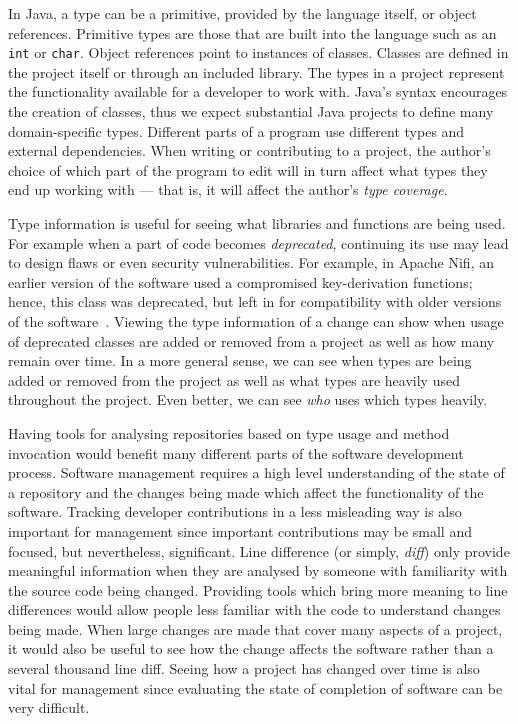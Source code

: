 \documentclass[conference]{IEEEtran}
\begin{document}
In Java, a type can be a primitive, provided by the language itself, or object references. Primitive types are those that are built into the language such as an \texttt{int} or \texttt{char}. Object references point to instances of classes. Classes are defined in the project itself or through an included library. The types in a project represent the functionality available for a developer to work with. Java’s syntax encourages the creation of classes, thus we expect substantial Java projects to define many domain-specific types. Different parts of a program use different types and external dependencies. When writing or contributing to a project, the author’s choice of which part of the program to edit will in turn affect what types they end up working with --- that is, it will affect the author’s \emph{type coverage}.

Type information is useful for seeing what libraries and functions are being used.  For example when a part of code becomes \emph{deprecated}, continuing its use may lead to design flaws or even security vulnerabilities. For example, in Apache Nifi, an earlier version of the software used a compromised key-derivation functions; hence, this class was deprecated, but left in for compatibility with older versions of the software~\cite{nifi}. Viewing the type information of a change can show when usage of deprecated classes are added or removed from a project as well as how many remain over time. In a more general sense, we can see when types are being added or removed from the project as well as what types are heavily used throughout the project. Even better, we can see \emph{who} uses which types heavily.

Having tools for analysing repositories based on type usage and method invocation would benefit many different parts of the software development process. Software management requires a high level understanding of the state of a repository and the changes being made which affect the functionality of the software. Tracking developer contributions in a less misleading way is also important for management since important contributions may be small and focused, but nevertheless, significant. Line difference (or simply, \emph{diff}) only provide meaningful information when they are analysed by someone with familiarity with the source code being changed. Providing tools which bring more meaning to line differences would allow people less familiar with the code to understand changes being made. When large changes are made that cover many aspects of a project, it would also be useful to see how the change affects the software rather than a several thousand line diff.  Seeing how a project has changed over time is also vital for management since evaluating the state of completion of software can be very difficult.
\end{document}
